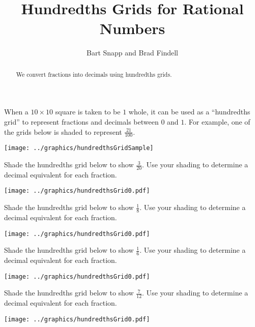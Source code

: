 \documentclass[nooutcomes]{ximera}
\title{Hundredths Grids for Rational Numbers}
\author{Bart Snapp and Brad Findell}
\begin{document}
\begin{abstract}
  We convert fractions into decimals using hundredths grids.
\end{abstract}
\maketitle

\label{A:hundredthsGrids}


When a $10\times 10$ square is taken to be $1$ whole, it can be used as a ``hundredths grid'' 
to represent fractions and decimals between $0$ and $1$. For example, one of the grids below 
is shaded to represent $\frac{21}{100}$.
\begin{image}
  \texttt{[image: ../graphics/hundredthsGridSample]}
\end{image}


\begin{problem}
  Shade the hundredths grid below to show $\frac{3}{20}$. Use your
  shading to determine a decimal equivalent for each fraction.
  \begin{image}
    \texttt{[image: ../graphics/hundredthsGrid0.pdf]}
  \end{image}
\end{problem}



\begin{problem}
  Shade the hundredths grid below to show $\frac{1}{8}$. Use your
  shading to determine a decimal equivalent for each fraction.
  \begin{image}
    \texttt{[image: ../graphics/hundredthsGrid0.pdf]}
  \end{image}
\end{problem}



\begin{problem}
  Shade the hundredths grid below to show $\frac{1}{6}$. Use your
  shading to determine a decimal equivalent for each fraction.
  \begin{image}
    \texttt{[image: ../graphics/hundredthsGrid0.pdf]}
  \end{image}
\end{problem}


\begin{problem}
  Shade the hundredths grid below to show $\frac{7}{12}$. Use your
  shading to determine a decimal equivalent for each fraction.
  \begin{image}
    \texttt{[image: ../graphics/hundredthsGrid0.pdf]}
  \end{image}
\end{problem}
  
\end{document}
